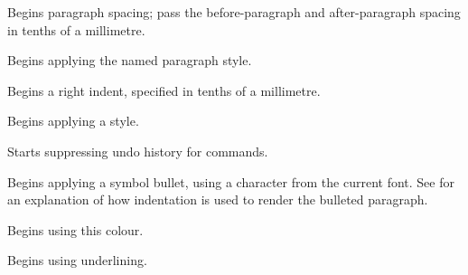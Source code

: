 Begins paragraph spacing; pass the before-paragraph and after-paragraph spacing in tenths of
a millimetre.

\label{wxrichtextctrlbeginparagraphstyle}


Begins applying the named paragraph style.

\label{wxrichtextctrlbeginrightindent}


Begins a right indent, specified in tenths of a millimetre.

\label{wxrichtextctrlbeginstyle}


Begins applying a style.

\label{wxrichtextctrlbeginsuppressundo}


Starts suppressing undo history for commands.

\label{wxrichtextctrlbeginsymbolbullet}


Begins applying a symbol bullet, using a character from the current font. See  for
an explanation of how indentation is used to render the bulleted paragraph.

\label{wxrichtextctrlbegintextcolour}


Begins using this colour.

\label{wxrichtextctrlbeginunderline}


Begins using underlining.

\label{wxrichtextctrlbeginurl}


